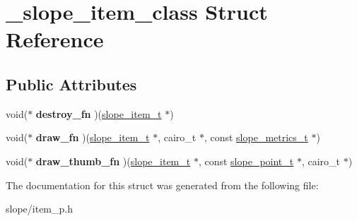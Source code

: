 \hypertarget{struct__slope__item__class}{\section{\+\_\+slope\+\_\+item\+\_\+class Struct Reference}
\label{struct__slope__item__class}
}
\subsection*{Public Attributes}
\begin{DoxyCompactItemize}
\item 
\hypertarget{struct__slope__item__class_ae4ab90f79eb6bda572bea0477ca14462}{void($\ast$ {\bfseries destroy\+\_\+fn} )(\hyperlink{group__Item_ga2616141f0e164a876049da51ea3a8646}{slope\+\_\+item\+\_\+t} $\ast$)}\label{struct__slope__item__class_ae4ab90f79eb6bda572bea0477ca14462}

\item 
\hypertarget{struct__slope__item__class_ae5ab35bbf8653c59ad6fa0a37757cc9f}{void($\ast$ {\bfseries draw\+\_\+fn} )(\hyperlink{group__Item_ga2616141f0e164a876049da51ea3a8646}{slope\+\_\+item\+\_\+t} $\ast$, cairo\+\_\+t $\ast$, const \hyperlink{group__Metrics_gab80787ee8ae8dc449e770249fe0e3c35}{slope\+\_\+metrics\+\_\+t} $\ast$)}\label{struct__slope__item__class_ae5ab35bbf8653c59ad6fa0a37757cc9f}

\item 
\hypertarget{struct__slope__item__class_a290befa5d0305d18c40bdc3469ecd366}{void($\ast$ {\bfseries draw\+\_\+thumb\+\_\+fn} )(\hyperlink{group__Item_ga2616141f0e164a876049da51ea3a8646}{slope\+\_\+item\+\_\+t} $\ast$, const \hyperlink{struct__slope__point}{slope\+\_\+point\+\_\+t} $\ast$, cairo\+\_\+t $\ast$)}\label{struct__slope__item__class_a290befa5d0305d18c40bdc3469ecd366}

\end{DoxyCompactItemize}


The documentation for this struct was generated from the following file\+:\begin{DoxyCompactItemize}
\item 
slope/item\+\_\+p.\+h\end{DoxyCompactItemize}
